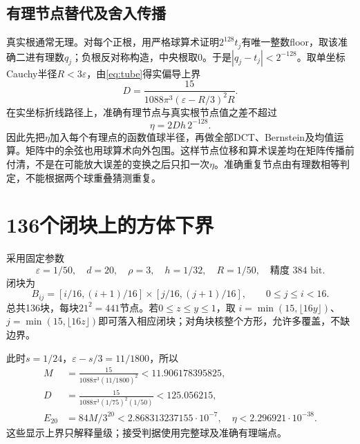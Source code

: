 \documentclass[UTF8,11pt,a4paper,fontset=fandol]{ctexart}
\theoremstyle{definition}\newtheorem{definition}[theorem]{定义}
\theoremstyle{remark}\newtheorem{remark}[theorem]{注}
\newcommand{\abs}[1]{\left|#1\right|}
\begin{document}
\subsection{有理节点替代及舍入传播}
真实根通常无理。对每个正根，用严格球算术证明$2^{128}t_j$有唯一整数floor，取该准确二进有理数$q_j$；负根反对称构造，中央根取$0$。于是$\abs{q_j-t_j}<2^{-128}$。取单坐标Cauchy半径$R<3\varepsilon$，由\eqref{eq:tube}得实偏导上界
\begin{equation}\label{eq:derivative}
 D=\frac{15}{1088\pi^3(\varepsilon-R/3)^2R}.
\end{equation}
在实坐标折线路径上，准确有理节点与真实根节点值之差不超过
\begin{equation}\label{eq:displacement}
 \eta=2Dh\,2^{-128}.
\end{equation}
因此先把$\eta$加入每个有理点的函数值球半径，再做全部DCT、Bernstein及均值运算。矩阵中的余弦也用球算术向外包围。这样节点位移和算术误差均在矩阵传播前付清，不是在可能放大误差的变换之后只扣一次$\eta$。准确重复节点由有理数相等判定，不能根据两个球重叠猜测重复。

\section{136个闭块上的方体下界}
采用固定参数
\begin{equation}\label{eq:gparams}
 \varepsilon=1/50,\quad d=20,\quad \rho=3,\quad h=1/32,
 \quad R=1/50,\quad\text{精度 }384\text{ bit}.
\end{equation}
闭块为
\[
 B_{ij}=[i/16,(i+1)/16]\times[j/16,(j+1)/16],
 \qquad0\le j\le i<16.
\]
总共136块，每块$21^2=441$节点。若$0\le z\le y\le1$，取
$i=\min(15,\lfloor16y\rfloor)$、$j=\min(15,\lfloor16z\rfloor)$即可落入相应闭块；对角块核整个方形，允许多覆盖，不缺边界。

此时$s=1/24$，$\varepsilon-s/3=11/1800$，所以
\begin{align*}
 M&=\frac{15}{1088\pi^3(11/1800)^2}<11.906178395825,\\
 D&=\frac{15}{1088\pi^3(1/75)^2(1/50)}<125.056215,\\
 E_{20}&=84M/3^{20}<2.868313237155\cdot10^{-7},\quad
 \eta<2.296921\cdot10^{-38}.
\end{align*}
这些显示上界只解释量级；接受判据使用完整球及准确有理端点。
\end{document}
